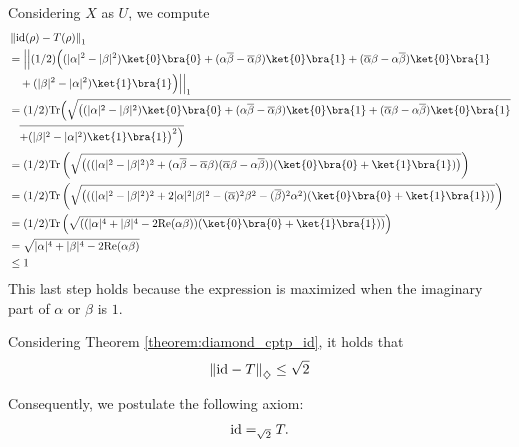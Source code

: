 \begin{example}
Considering $X$ as $U$, we compute
\begin{align*}
  &  \tracenorm{ \id(\rho) - T(\rho)} \\
  &  = \Big|\Big| (1/2) \Big( (|\alpha|^2 -|\beta|^2) \ket{0}\bra{0} + (\alpha \overline{\beta}-\overline{\alpha} \beta)\ket{0}\bra{1} + (\overline{\alpha} \beta-\alpha \overline{\beta})\ket{0}\bra{1}    \\
  & \hspace{10pt}  + (|\beta|^2 -|\alpha|^2 )\ket{1}\bra{1} \Big) \Big|\Big|_1  \\
  &  = (1/2) \tr \Big( \sqrt{\big( (|\alpha|^2 -|\beta|^2) \ket{0}\bra{0} + (\alpha \overline{\beta}-\overline{\alpha} \beta)\ket{0}\bra{1} + (\overline{\alpha} \beta-\alpha \overline{\beta})\ket{0}\bra{1} }  \\
  & \hspace{10pt} \overline{+(|\beta|^2 -|\alpha|^2 )\ket{1}\bra{1}   \big)^2\Big)}\\
  &  = (1/2) \tr \left( \sqrt{\left( ((|\alpha|^2 -|\beta|^2 )^2 + (\alpha \overline{\beta}-\overline{\alpha} \beta)(\overline{\alpha} \beta-\alpha \overline{\beta}))  (\ket{0}\bra{0} + \ket{1}\bra{1})  \right)}\right)  \\
  &  = (1/2) \tr \left( \sqrt{\left( ((|\alpha|^2 -|\beta|^2 )^2 + 2|\alpha|^2|\beta|^2 - (\overline{\alpha})^{2}\beta^2 -  (\overline{\beta})^{2}\alpha^2 )  (\ket{0}\bra{0} + \ket{1}\bra{1})  \right)}\right) \\
  &  = (1/2) \tr \left( \sqrt{\left( (|\alpha|^4+ |\beta|^4 - 2 \text{Re}(\alpha \beta) )  (\ket{0}\bra{0} + \ket{1}\bra{1})  \right)}\right) \\
  & =  \sqrt{|\alpha|^4+ |\beta|^4 - 2 \text{Re}(\alpha \beta)} \\
  & \leq 1
\end{align*}
This last step holds because the expression is maximized when the imaginary part of $\alpha$ or $\beta$ is $1$.

Considering Theorem \ref{theorem:diamond_cptp_id}, it holds that
\begin{align*}
  \left\lVert  \mathrm{id} - T \right\rVert_{\diamondsuit} \leq \sqrt{2}
\end{align*}

Consequently, we postulate the following axiom:
    \begin{align} \label{eq:t_teleport}
        \mathrm{id} =_{ \sqrt{2}} T.
    \end{align}


\end{example}
